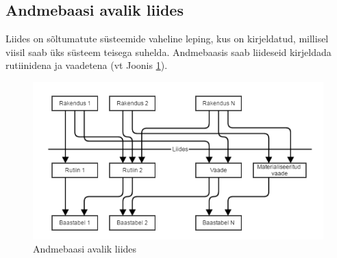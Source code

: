 \documentclass[a4paper,12pt]{article} %
\begin{document}
\subsection{Andmebaasi avalik liides}
\label{andmebaasi_avalik_liides}
Liides on sõltumatute süsteemide vaheline leping, kus on kirjeldatud, millisel viisil saab üks süsteem teisega suhelda.
Andmebaasis saab liideseid kirjeldada rutiinidena ja vaadetena (vt Joonis \ref{fig_andmebaasi_avalik_liides}).

\begin{figure}[H]
\centering
\includegraphics[width=\textwidth]{./diagrams/db-interface.png}
\caption{Andmebaasi avalik liides}
\label{fig_andmebaasi_avalik_liides}
\end{figure}
\end{document}
